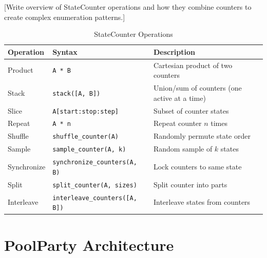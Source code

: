\documentclass[11pt]{article}
\begin{document}
[Write overview of StateCounter operations and how they combine counters
to create complex enumeration patterns.]


\begin{table}[htbp]
\centering
\caption{StateCounter Operations}
\label{tab:statecounter-ops}
\begin{tabular}{@{}lll@{}}
\toprule
\textbf{Operation} & \textbf{Syntax} & \textbf{Description} \\
\midrule
Product & \texttt{A * B} & Cartesian product of two counters \\
Stack & \texttt{stack([A, B])} & Union/sum of counters (one active at a time) \\
Slice & \texttt{A[start:stop:step]} & Subset of counter states \\
Repeat & \texttt{A * n} & Repeat counter $n$ times \\
Shuffle & \texttt{shuffle_counter(A)} & Randomly permute state order \\
Sample & \texttt{sample_counter(A, k)} & Random sample of $k$ states \\
Synchronize & \texttt{synchronize_counters(A, B)} & Lock counters to same state \\
Split & \texttt{split_counter(A, sizes)} & Split counter into parts \\
Interleave & \texttt{interleave_counters([A, B])} & Interleave states from counters \\
\bottomrule
\end{tabular}
\end{table}



\section{PoolParty Architecture}
\label{sec:poolparty-architecture}

%
\end{document}
